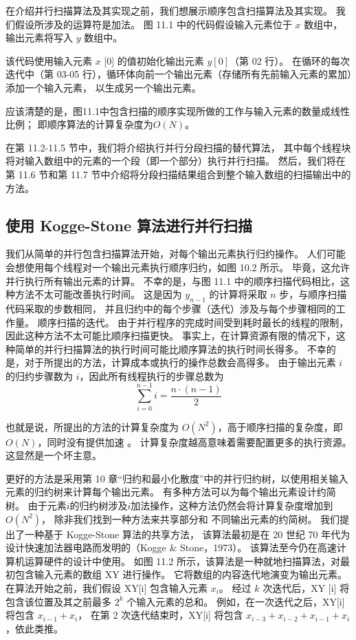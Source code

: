 在介绍并行扫描算法及其实现之前，我们想展示顺序包含扫描算法及其实现。 我们假设所涉及的运算符是加法。 
图 11.1 中的代码假设输入元素位于 $x$ 数组中，输出元素将写入 $y$ 数组中。

该代码使用输入元素 $x$ [0] 的值初始化输出元素 $y[0]$（第 02 行）。 
在循环的每次迭代中（第 03-05 行），循环体向前一个输出元素（存储所有先前输入元素的累加）添加一个输入元素，
以生成另一个输出元素。

应该清楚的是，图11.1中包含扫描的顺序实现所做的工作与输入元素的数量成线性比例； 即顺序算法的计算复杂度为$O(N)$。

在第 11.2-11.5 节中，我们将介绍执行并行分段扫描的替代算法，
其中每个线程块将对输入数组中的元素的一个段（即一个部分）执行并行扫描。 
然后，我们将在第 11.6 节和第 11.7 节中介绍将分段扫描结果组合到整个输入数组的扫描输出中的方法。

\subsection{使用 Kogge-Stone 算法进行并行扫描}
我们从简单的并行包含扫描算法开始，对每个输出元素执行归约操作。 
人们可能会想使用每个线程对一个输出元素执行顺序归约，如图 10.2 所示。 毕竟，这允许并行执行所有输出元素的计算。 
不幸的是，与图 11.1 中的顺序扫描代码相比，这种方法不太可能改善执行时间。 
这是因为 $y_{n-1}$ 的计算将采取 $n$ 步，与顺序扫描代码采取的步数相同，
并且归约中的每个步骤（迭代）涉及与每个步骤相同的工作量。 顺序扫描的迭代。 
由于并行程序的完成时间受到耗时最长的线程的限制，因此这种方法不太可能比顺序扫描更快。 
事实上，在计算资源有限的情况下，这种简单的并行扫描算法的执行时间可能比顺序算法的执行时间长得多。 
不幸的是，对于所提出的方法，计算成本或执行的操作总数会高得多。 
由于输出元素 $i$ 的归约步骤数为 $i$，因此所有线程执行的步骤总数为
$$
\sum_{i=0}^{n-1} i=\frac{n \cdot(n-1)}{2}
$$

也就是说，所提出的方法的计算复杂度为 $O\left(N^{2}\right)$，高于顺序扫描的复杂度，即 $O(N)$，同时没有提供加速 。 
计算复杂度越高意味着需要配置更多的执行资源。 这显然是一个坏主意。

更好的方法是采用第 10 章“归约和最小化散度”中的并行归约树，以使用相关输入元素的归约树来计算每个输出元素。 
有多种方法可以为每个输出元素设计约简树。 
由于元素$i$的归约树涉及$i$加法操作，这种方法仍然会将计算复杂度增加到$O\left(N^{2}\right)$，
除非我们找到一种方法来共享部分和 不同输出元素的约简树。 
我们提出了一种基于 Kogge-Stone 算法的共享方法，
该算法最初是在 20 世纪 70 年代为设计快速加法器电路而发明的（Kogge \& Stone，1973）。 
该算法至今仍在高速计算机运算硬件的设计中使用。 
如图 11.2 所示，该算法是一种就地扫描算法，对最初包含输入元素的数组 XY 进行操作。 
它将数组的内容迭代地演变为输出元素。 在算法开始之前，我们假设 XY[i] 包含输入元素 $x_{i}$。 
经过 $k$ 次迭代后，$\mathrm{XY}$ [i] 将包含该位置及其之前最多 $2^{k}$ 个输入元素的总和。 
例如，在一次迭代之后，XY[i] 将包含 $x_{i-1}+x_{i}$，
在第 2 次迭代结束时，XY[i] 将包含 $x_{i-3}+x_{ i-2}+x_{i-1}+x_{i}$，依此类推。

